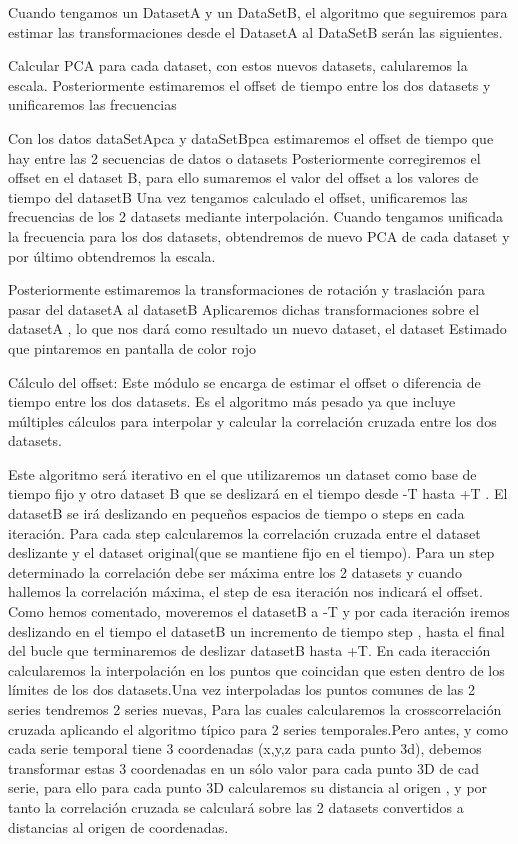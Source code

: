 Cuando tengamos un DatasetA y un DataSetB, el algoritmo que seguiremos para estimar las transformaciones desde el DatasetA al DataSetB serán las siguientes.

Calcular PCA para cada dataset, con estos nuevos datasets, calularemos la escala. Posteriormente estimaremos el offset de tiempo entre los dos datasets y unificaremos las 
frecuencias

Con los datos dataSetApca y dataSetBpca estimaremos el offset de tiempo que hay entre las 2 secuencias de datos o datasets
Posteriormente corregiremos el offset en el dataset B, para ello sumaremos el valor del offset a los valores de tiempo del datasetB
Una vez tengamos calculado el offset, unificaremos las frecuencias de los 2 datasets mediante interpolación.
Cuando tengamos unificada la frecuencia para los dos datasets, obtendremos de nuevo PCA de cada dataset y por último obtendremos la escala.

Posteriormente estimaremos  la transformaciones de rotación y traslación para pasar del datasetA al datasetB
Aplicaremos dichas transformaciones sobre el datasetA , lo que nos dará como resultado un nuevo dataset, el dataset Estimado que pintaremos en pantalla de color rojo

Cálculo del offset:
Este módulo se encarga de estimar el offset o diferencia de tiempo entre los dos datasets. Es el algoritmo más pesado ya que incluye múltiples cálculos para interpolar y calcular 
la correlación cruzada entre los dos datasets.

Este algoritmo será iterativo en el que utilizaremos un dataset como base de tiempo fijo y otro dataset B que se deslizará en el tiempo desde -T hasta +T . El datasetB se irá 
deslizando en pequeños espacios de tiempo o steps en cada iteración. Para cada step calcularemos la correlación cruzada entre el dataset deslizante y el dataset original(que se 
mantiene fijo en el tiempo). Para un step determinado la correlación debe ser máxima entre los 2 datasets y cuando hallemos la correlación máxima, el step de esa iteración nos 
indicará el offset. Como hemos comentado, moveremos el datasetB a -T y por cada iteración iremos deslizando en el tiempo el datasetB un incremento de tiempo step , hasta el final 
del bucle que terminaremos de deslizar datasetB hasta +T. En cada iteracción calcularemos la interpolación en los puntos que coincidan que esten dentro de los límites de los dos 
datasets.Una vez interpoladas los puntos comunes de las 2 series tendremos 2 series nuevas, Para las cuales calcularemos la crosscorrelación cruzada aplicando el algoritmo típico 
para 2 series temporales.Pero antes, y como cada serie temporal tiene 3 coordenadas (x,y,z para cada punto 3d), debemos transformar estas 3 coordenadas en un sólo valor para cada 
punto 3D de cad serie, para ello para cada punto 3D calcularemos su distancia al origen , y por tanto la correlación cruzada se calculará sobre las 2 datasets convertidos a 
distancias al origen de coordenadas.

